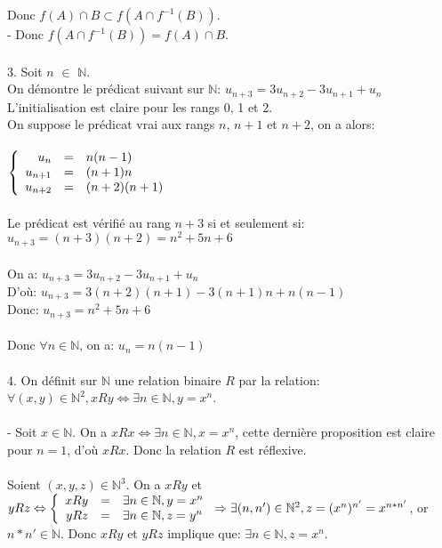 \documentclass{article}
\begin{document}
		Donc $f(A) \cap B \subset f(A \cap f^{-1}(B))$.\\
		- Donc $f(A \cap f^{-1}(B)) = f(A) \cap B$.\\\\
		3. Soit $n$ $\in$ $\mathbb{N}$.\\
		On démontre le prédicat suivant sur $\mathbb{N}$: $u_{n+3}=3u_{n+2}-3u_{n+1}+u_n$\\
		L'initialisation est claire pour les rangs 0, 1 et 2.\\
		On suppose le prédicat vrai aux rangs $n$, $n+1$ et $n+2$, on a alors:\\\\
		$\left\{\begin{array}{r c l}
		u_n &=& n(n-1)\\
		u_{n+1} &=& (n+1)n\\
		u_{n+2} &=& (n+2)(n+1)
		\end{array}\right.$\\\\
		Le prédicat est vérifié au rang $n+3$ si et seulement si: $u_{n+3}=(n+3)(n+2)=n^2+5n+6$\\\\
		On a: $u_{n+3}=3u_{n+2}-3u_{n+1}+u_n$\\
		D'où: $u_{n+3}=3(n+2)(n+1)-3(n+1)n+n(n-1)$\\
		Donc: $u_{n+3}=n^2+5n+6$\\\\
		Donc $\forall n \in \mathbb{N}$, on a: $u_n=n(n-1)$\\\\
		4. On définit sur $\mathbb{N}$ une relation binaire $R$ par la relation: $\forall (x,y) \in \mathbb{N}^2, xRy \Leftrightarrow \exists n \in \mathbb{N}, y=x^n$.\\\\
		- Soit $x \in \mathbb{N}$. On a $xRx \Leftrightarrow \exists n \in \mathbb{N}, x=x^n$, cette dernière proposition est claire pour $n=1$, d'où $xRx$. Donc la relation $R$ est réflexive.\\\\
		Soient $(x,y,z) \in \mathbb{N}^3$. On a $xRy$ et $yRz \Leftrightarrow \left\{\begin{array}{r c l}
		xRy &=& \exists n \in \mathbb{N}, y=x^n\\
		yRz &=& \exists n \in \mathbb{N}, z=y^n
		\end{array}\right.\Rightarrow \exists (n,n') \in \mathbb{N}^2, z=(x^n)^{n'}=x^{n*n'}$, or $n*n' \in \mathbb{N}$. Donc $xRy$ et $yRz$ implique que: $\exists n \in \mathbb{N}, z=x^n$.\\
\end{document}
